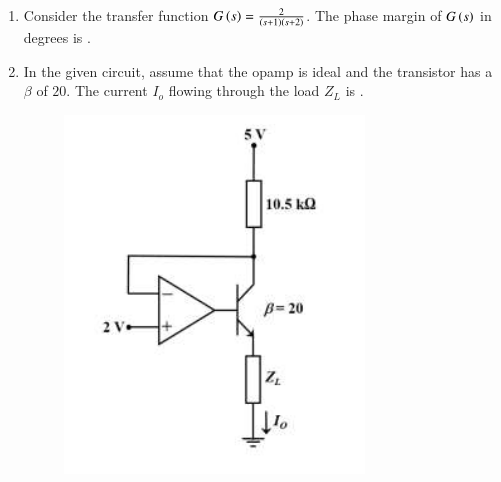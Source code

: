 \documentclass[journal,12pt,onecolumn]{IEEEtran}
\theoremstyle{remark}
\begin{document}
\begin{enumerate}
\begin{enumerate}
\begin{figure}[H]
        \end{figure}
    \end{enumerate}

    \newpage

    \item Consider the transfer function $G\left(s\right)=\frac{2}{\left(s+1\right)\left(s+2\right)}$. The phase margin of $G\left(s\right)$ in degrees is \underline{\hspace{2cm}}.
    
    \hfill{}

    
    \item In the given circuit, assume that the opamp is ideal and the transistor has a $\beta$ of $20$. The current $I_{o}$  flowing through the load $Z_{L}$ is \underline{\hspace{2cm}}.
    \begin{figure}[H]
        \centering
        \includegraphics[width=0.4\columnwidth]{q15.png}
        \caption*{}
        \label{fig:q15}
    \end{figure}
    

\end{enumerate}
\end{document}
